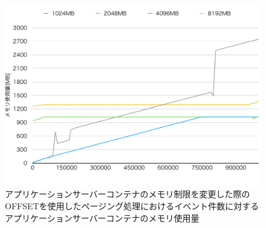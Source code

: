 \documentclass[../../../../../main]{subfiles}
\begin{document}
    \begin{figure}[H]
        \centering
        \includegraphics[width=12cm]{graph}
        \caption{アプリケーションサーバーコンテナのメモリ制限を変更した際のOFFSETを使用したページング処理におけるイベント件数に対するアプリケーションサーバーコンテナのメモリ使用量}
        \label{fig:paging-offset-change-app-memory-limit-app-memory-app_4_db_1_1024}
    \end{figure}
\end{document}
